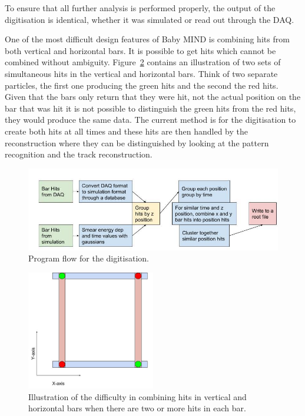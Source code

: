 To ensure that all further analysis is performed properly, the output of the digitisation is identical, whether it was simulated or read out through the DAQ.

One of the most difficult design features of Baby MIND is combining hits from both vertical and horizontal bars. It is possible to get hits which cannot be combined without ambiguity. Figure~\ref{fig:BarAmbi} contains an illustration of two sets of simultaneous hits in the vertical and horizontal bars. Think of two separate particles, the first one producing the green hits and the second the red hits. Given that the bars only return that they were hit, not the actual position on the bar that was hit it is not possible to distinguish the green hits from the red hits, they would produce the same data. The current method is for the digitisation to create both hits at all times and these hits are then handled by the reconstruction where they can be distinguished by looking at the pattern recognition and the track reconstruction.

\begin{figure}[h!]
\centering
\includegraphics[width=\textwidth]{figures/Digitisation.jpg}
\caption{Program flow for the digitisation.}
\label{fig:digi}
\end{figure}

\begin{figure}[h!]
\centering
\includegraphics[width=0.5\textwidth]{figures/BarsAmbi.jpg}
\caption{Illustration of the difficulty in combining hits in vertical and horizontal bars when there are two or more hits in each bar.}
\label{fig:BarAmbi}
\end{figure}

